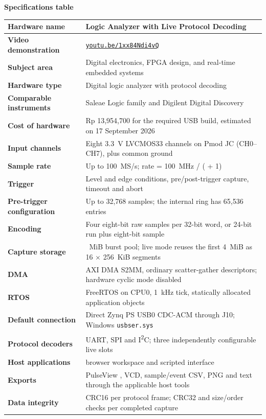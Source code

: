 \documentclass[11pt,a4paper]{article}
\newcommand{\code}[1]{\texttt{\detokenize{#1}}}
\newcommand{\iu}{I\textsuperscript{2}C}
\begin{document}
\newpage
\textbf{Specifications table}\\
\vskip 0.2cm
\begin{tabularx}{\linewidth}{|>{\raggedright\arraybackslash}p{4.5cm}|>{\raggedright\arraybackslash}X|}
\hline
\textbf{Hardware name} & Logic Analyzer with Live Protocol Decoding \\ \hline
\textbf{Video demonstration} &
\href{https://youtu.be/1xx84Ndi4vQ?si=ldsuYEWvYVqu2u6-}{\texttt{youtu.be/1xx84Ndi4vQ}} \\ \hline
\textbf{Subject area} & Digital electronics, FPGA design, and real-time embedded systems \\ \hline
\textbf{Hardware type} & Digital logic analyzer with protocol decoding \\ \hline
\textbf{Comparable instruments} & Saleae Logic family and Digilent Digital
Discovery \\ \hline
\textbf{Cost of hardware} & Rp 13,954,700 for the required USB build, estimated
on 17 September 2026 \\ \hline
\textbf{Input channels} & Eight 3.3~V LVCMOS33 channels on Pmod JC (CH0--CH7),
plus common ground \\ \hline
\textbf{Sample rate} & Up to 100~MS/s; rate = 100~MHz / (\code{SAMPLE_DIV} + 1) \\ \hline
\textbf{Trigger} & Level and edge conditions, pre/post-trigger capture, timeout
and abort \\ \hline
\textbf{Pre-trigger configuration} & Up to 32,768 samples; the internal ring has
65,536 entries \\ \hline
\textbf{Encoding} & Four eight-bit raw samples per 32-bit word, or 24-bit run
plus eight-bit sample \\ \hline
\textbf{Capture storage} & 8~MiB burst pool; live mode reuses the first 4~MiB as
16 $\times$ 256~KiB segments \\ \hline
\textbf{DMA} & AXI DMA S2MM, ordinary scatter-gather descriptors; hardware cyclic
mode disabled \\ \hline
\textbf{RTOS} & FreeRTOS on CPU0, 1~kHz tick, statically allocated application
objects \\ \hline
\textbf{Default connection} & Direct Zynq PS USB0 CDC-ACM through J10; Windows
\texttt{usbser.sys} \\ \hline
\textbf{Protocol decoders} & UART, SPI and \iu{}; three independently
configurable live slots \\ \hline
\textbf{Host applications} & \code{la-ui} browser workspace and \code{la-cli}
scripted interface \\ \hline
\textbf{Exports} & PulseView \code{.sr}, VCD, sample/event CSV, PNG and text
through the applicable host tools \\ \hline
\textbf{Data integrity} & CRC16 per protocol frame; CRC32 and size/order checks
per completed capture \\ \hline
\end{tabularx}
\end{document}
